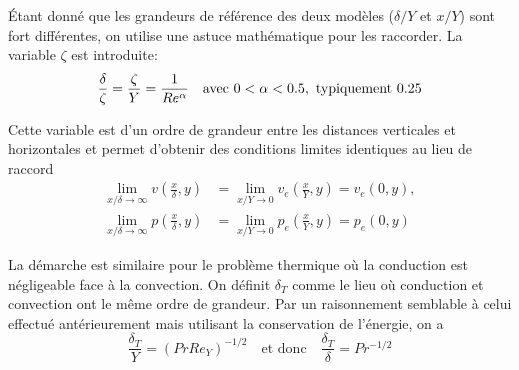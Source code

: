     Étant donné que les grandeurs de référence des deux modèles ($\delta/Y$ et $x/Y$) sont fort différentes, on utilise une astuce mathématique pour les raccorder. La variable $\zeta$ est introduite:
    \begin{equation}
      \frac{\delta}{\zeta} = \frac{\zeta}{Y} = \frac{1}{Re^\alpha} \quad \textrm{avec } 0 < \alpha < 0.5,\textrm{ typiquement } 0.25
    \end{equation}

    Cette variable est d'un ordre de grandeur entre les distances verticales et horizontales et permet d'obtenir des conditions limites identiques au lieu de raccord
    \begin{equation}
      \begin{aligned}
        \lim_{x/\delta\rightarrow \infty} v\left(\frac{x}{\delta},y\right) &= \lim_{x/Y \rightarrow 0} v_e\left(\frac{x}{Y}, y\right) = v_e (0, y),\\
        \lim_{x/\delta \rightarrow \infty} p\left(\frac{x}{\delta},y\right) &= \lim_{x/Y \rightarrow 0} p_e\left(\frac{x}{Y},y\right) = p_e (0, y)
      \end{aligned}
    \end{equation}

    La démarche est similaire pour le problème thermique où la conduction est négligeable face à la convection. On définit $\delta_T$ comme le lieu où conduction et convection ont le même ordre de grandeur. Par un raisonnement semblable à celui effectué antérieurement mais utilisant la conservation de l'énergie, on a
    \begin{equation}
      \frac{\delta_T}{Y} = (Pr Re_Y)^{-1/2} \quad \textrm{et donc} \quad \frac{\delta_T}{\delta} = Pr^{-1/2}
    \end{equation}
